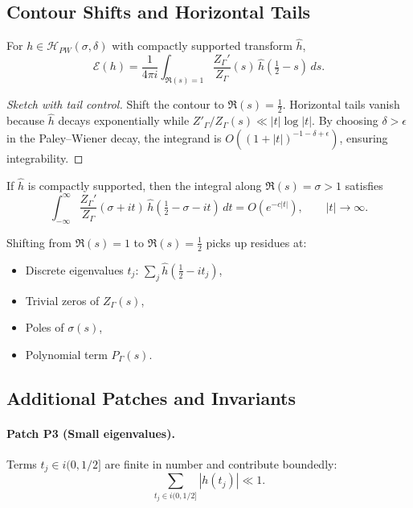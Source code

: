 \subsection{Contour Shifts and Horizontal Tails}

\begin{theorem}
\label{thm:balanced-contour}
For $h \in \mathcal{H}_{PW}(\sigma,\delta)$ with compactly supported transform $\widehat h$,
\[
\mathcal{E}(h) = \frac{1}{4\pi i}\int_{\Re(s)=1} \frac{Z_\Gamma'}{Z_\Gamma}(s)\,
\widehat{h}\!\left(\tfrac12-s\right)\,ds.
\]
\end{theorem}

\begin{proof}[Sketch with tail control]
Shift the contour to $\Re(s)=\tfrac12$. Horizontal tails vanish because $\widehat h$ decays exponentially while $Z'_\Gamma/Z_\Gamma(s)\ll |t|\log|t|$. By choosing $\delta>\epsilon$ in the Paley–Wiener decay, the integrand is $O((1+|t|)^{-1-\delta+\epsilon})$, ensuring integrability.
\end{proof}

\begin{lemma}
\label{lem:horizontal-tails}
If $\widehat h$ is compactly supported, then the integral along $\Re(s)=\sigma>1$ satisfies
\[
\int_{-\infty}^\infty \frac{Z_\Gamma'}{Z_\Gamma}(\sigma+it)\,\widehat h(\tfrac12-\sigma-it)\,dt
= O(e^{-c|t|}), \qquad |t|\to\infty.
\]
\end{lemma}

\begin{remark}
Shifting from $\Re(s)=1$ to $\Re(s)=\tfrac12$ picks up residues at:
\begin{itemize}
  \item Discrete eigenvalues $t_j$: $\sum_j \widehat h(\tfrac12-it_j)$,
  \item Trivial zeros of $Z_\Gamma(s)$,
  \item Poles of $\sigma(s)$,
  \item Polynomial term $P_\Gamma(s)$.
\end{itemize}
\end{remark}

\subsection{Additional Patches and Invariants}

\paragraph{Patch P3 (Small eigenvalues).}  
Terms $t_j \in i(0,1/2]$ are finite in number and contribute boundedly:
\[
\sum_{t_j \in i(0,1/2]} |h(t_j)| \ll 1.
\]


